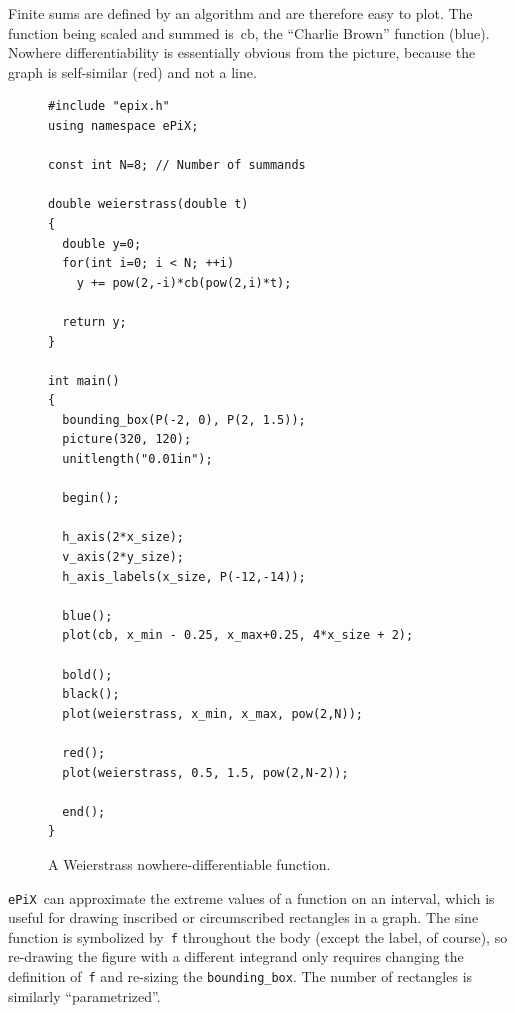 \documentclass[11pt]{article}
\newcommand{\ePiX}{\texttt{ePiX}}
\begin{document}
\clearpage

\noindent Finite sums are defined by an algorithm and are therefore
easy to plot. The function being scaled and summed is~cb, the
``Charlie Brown'' function (blue). Nowhere differentiability is
essentially obvious from the picture, because the graph is
self-similar (red) and not a line.

\begin{figure}[hbt]
\begin{center}

\vspace*{-1.375in}
\begin{small}
\begin{verbatim}
#include "epix.h"
using namespace ePiX;

const int N=8; // Number of summands

double weierstrass(double t)
{
  double y=0;
  for(int i=0; i < N; ++i)
    y += pow(2,-i)*cb(pow(2,i)*t);

  return y;
}

int main() 
{
  bounding_box(P(-2, 0), P(2, 1.5));
  picture(320, 120);
  unitlength("0.01in");

  begin();

  h_axis(2*x_size);
  v_axis(2*y_size);
  h_axis_labels(x_size, P(-12,-14));
  
  blue();
  plot(cb, x_min - 0.25, x_max+0.25, 4*x_size + 2);

  bold();
  black();
  plot(weierstrass, x_min, x_max, pow(2,N));

  red();
  plot(weierstrass, 0.5, 1.5, pow(2,N-2));

  end();
}

\end{verbatim}
\end{small}
\caption{A Weierstrass nowhere-differentiable function.}
\label{fig:weierstrass}
\end{center}
\end{figure}

\clearpage

\ePiX\ can approximate the extreme values of a function on an
interval, which is useful for drawing inscribed or circumscribed
rectangles in a graph. The sine function is symbolized by~\texttt{f}
throughout the body (except the label, of course), so re-drawing the
figure with a different integrand only requires changing the
definition of~\texttt{f} and re-sizing the \verb+bounding_box+.  The
number of rectangles is similarly ``parametrized''.
\end{document}
